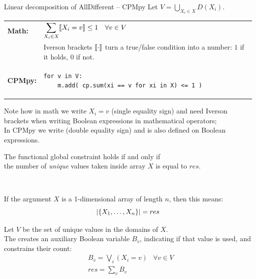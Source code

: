 \documentclass{cons-beamer}
\begin{document}
\begin{flashcardcpmpy}
\begin{frame}[fragile]{Linear decomposition of AllDifferent -- CPMpy}
  Let $V = \bigcup_{X_i \in X} D(X_i)$.
  \begin{center}
    \begin{tabular}{@{}ll@{}}
      \textbf{Math:} &
      $\displaystyle
        \sum_{X_i \in X} \llbracket X_i = v \rrbracket \leq 1
        \quad\forall v \in V
      $
      \\
      &
      {\small
        Iverson brackets $\llbracket \cdot \rrbracket$ turn a true/false condition into a number:
        $1$ if it holds, $0$ if not.
      }
      \\
      \textbf{CPMpy:} &
      \begin{minipage}[t]{0.75\linewidth}
        \vspace{-0.5em}
        \begin{lstlisting}[language=cpmpy,basicstyle=\small]
for v in V:
    m.add( cp.sum(xi == v for xi in X) <= 1 )\end{lstlisting}
      \end{minipage}
    \end{tabular}
  \end{center}
  \vfill
  Note how in math we write $X_i = v$ (single equality sign) and need Iverson brackets when writing Boolean expressions in mathematical operators; \\
  In CPMpy we write  (double equality sign) and  is also defined on Boolean expressions.
\end{frame}
\end{flashcardcpmpy}

\begin{frame}{}
	\begin{definition}
		The  functional global constraint holds if and only if \\ 
		the number of \textit{unique} values taken inside array $X$ is equal to $res$. 
		
		$ $
		
		If the argument $X$ is a 1-dimensional array of length $n$, then this means:\vspace{-0.75em}
		\[ \left\lvert\left\{X_1,\dots,X_{n}\right\}\right\rvert = res \]
	\end{definition}
	\vfill
	
	Let $V$ be the set of unique values in the domains of $X$. \\
	The  creates an auxiliary Boolean variable $B_v$, indicating if that value is used, and constrains their count:
	\begin{align*}
		&B_v = \bigvee_{i} ( X_i = v ) &\forall v \in V \\
		&res = \sum_{v} B_v &
	\end{align*}
\end{frame}
\end{document}
